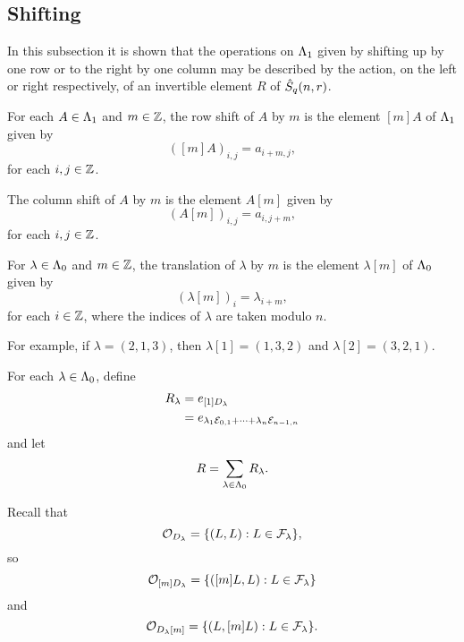 \documentclass[a4paper, 11pt]{report}
\begin{document}
\subsection{Shifting}

In this subsection it is shown that the operations on $\Lambda_1{}$ given by shifting up by one row or to the right by one column may be described by the action, on the left or right respectively, of an invertible element $R$ of $\hat{S}_q(n,r)$.

For each $A\in\Lambda_1{}$ and $m\in\mathbb{Z}$, the row shift of $A$ by $m$ is the element $[m]A$ of $\Lambda_1{}$ given by
\begin{equation*}
([m]A)_{i,j} = a_{i+m,j},
\end{equation*}
for each $i,j\in\mathbb{Z}$.

The column shift of $A$ by $m$ is the element $A[m]$ given by
\begin{equation*}
(A[m])_{i,j} = a_{i,j+m},
\end{equation*}
for each $i,j\in\mathbb{Z}$.

For $\lambda\in\Lambda_0{}$ and $m\in\mathbb{Z}$, the translation of $\lambda$ by $m$ is the element $\lambda[m]$ of $\Lambda_0{}$ given by
\begin{equation*}
(\lambda[m])_i = \lambda_{i+m},
\end{equation*}
for each $i\in\mathbb{Z}$, where the indices of $\lambda$ are taken modulo $n$.

For example, if $\lambda = (2,1,3)$, then $\lambda[1] = (1,3,2)$ and $\lambda[2]=(3,2,1)$.

For each $\lambda\in\Lambda_0{}$, define
\begin{align*}
R_\lambda &= e_{[1]D_\lambda}\\
&= e_{\lambda_1\mathcal{E}_{0,1}+\cdots +\lambda_n\mathcal{E}_{n-1,n}}
\end{align*}
and let
\begin{equation*}
R = \sum_{\lambda\in\Lambda_0{}} R_\lambda.
\end{equation*}

Recall that
\begin{equation*}
\mathcal{O}_{D_\lambda} = \{(L,L):L\in\mathcal{F}_\lambda\},
\end{equation*}
so
\begin{equation*}
\mathcal{O}_{[m]D_\lambda} = \{([m]L,L):L\in\mathcal{F}_\lambda\}
\end{equation*}
and
\begin{equation*}
\mathcal{O}_{D_\lambda [m]} = \{(L,[m]L):L\in\mathcal{F}_\lambda\}.
\end{equation*}
\end{document}

